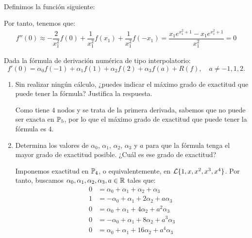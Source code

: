 \begin{ejercicio}
\begin{enumerate}
        Definimos la función siguiente:

        Por tanto, tenemos que:
        \begin{align*}
            f''(0)\approx -\dfrac{2}{x_1^2}f(0) + \dfrac{1}{x_1^2}f(x_1) + \dfrac{1}{x_1^2}f(-x_1)
            = \dfrac{x_1e^{x_1^2+1}-x_1e^{x_1^2+1}}{x_1^2}=0
        \end{align*}
        
    \end{enumerate}
\end{ejercicio}

\begin{ejercicio}\label{ej:2.2.6}
    Dada la fórmula de derivación numérica de tipo interpolatorio:
    \[
    f'(0) = \alpha_0 f(-1) + \alpha_1 f(1) + \alpha_2 f(2) + \alpha_3 f(a) + R(f), \quad a \neq -1, 1, 2.
    \]
    \begin{enumerate}
        \item Sin realizar ningún cálculo, ¿puedes indicar el máximo grado de exactitud que puede tener la fórmula? Justifica la respuesta.
        
        Como tiene $4$ nodos y se trata de la primera derivada, sabemos que no puede ser exacta en $\mathbb{P}_5$, por lo que el máximo grado de exactitud que puede tener la fórmula es $4$.
        
        \item Determina los valores de $\alpha_0$, $\alpha_1$, $\alpha_2$, $\alpha_3$ y $a$ para que la fórmula tenga el mayor grado de exactitud posible. ¿Cuál es ese grado de exactitud?
        
        Imponemos exactitud en $\mathbb{P}_4$, o equivalentemente, en $\mathcal{L}\{1, x, x^2,x^3,x^4\}$. Por tanto, buscamos $\alpha_0,\alpha_1,\alpha_2,\alpha_3, a\in\mathbb{R}$ tales que:
        \begin{align*}
            0 &= \alpha_0 + \alpha_1 + \alpha_2 + \alpha_3 \\
            1 &= -\alpha_0 + \alpha_1 + 2\alpha_2 + a\alpha_3 \\
            0 &= \alpha_0 + \alpha_1 + 4\alpha_2 + a^2\alpha_3 \\
            0 &= -\alpha_0 + \alpha_1 + 8\alpha_2 + a^3\alpha_3 \\
            0 &= \alpha_0 + \alpha_1 + 16\alpha_2 + a^4\alpha_3
        \end{align*}


\end{enumerate}
\end{ejercicio}

